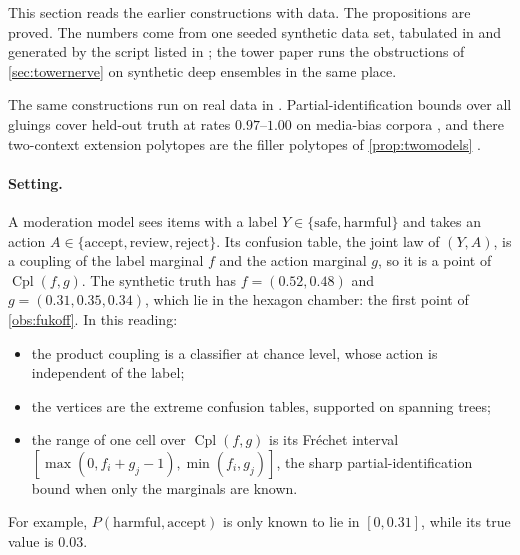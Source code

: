 \documentclass[11pt]{article}
\theoremstyle{definition}
\theoremstyle{remark}
\newcommand{\Cpl}{\operatorname{Cpl}}
\begin{document}
This section reads the earlier constructions with data. The propositions are proved. The numbers come from one
seeded synthetic data set, tabulated in \cite[\S15]{Awasthi-Family} and generated by the script listed in
\cite[Section~15]{Awasthi-Tower}; the tower paper runs the obstructions of \cref{sec:towernerve} on synthetic deep
ensembles in the same place.

The same constructions run on real data in \cite{Awasthi-ThreeLayers}. Partial-identification bounds over all gluings
cover held-out truth at rates $0.97$--$1.00$ on media-bias corpora \cite[\S38.5]{Awasthi-ThreeLayers}, and there two-context
extension polytopes are the filler polytopes of \cref{prop:twomodels} \cite[\S3.10]{Awasthi-ThreeLayers}.

\paragraph{Setting.} A moderation model sees items with a label $Y\in\{\text{safe},\text{harmful}\}$ and takes an action
$A\in\{\text{accept},\text{review},\text{reject}\}$. Its confusion table, the joint law of $(Y,A)$, is a coupling of the label
marginal $f$ and the action marginal $g$, so it is a point of $\Cpl(f,g)$. The synthetic truth has $f=(0.52,0.48)$ and
$g=(0.31,0.35,0.34)$, which lie in the hexagon chamber: the first point of \cref{obs:fukoff}. In this reading:
\begin{itemize}[leftmargin=*]
\item the product coupling is a classifier at chance level, whose action is independent of the label;
\item the vertices are the extreme confusion tables, supported on spanning trees;
\item the range of one cell over $\Cpl(f,g)$ is its Fr\'echet interval $[\max(0,f_i+g_j-1),\min(f_i,g_j)]$, the sharp
  partial-identification bound when only the marginals are known.
\end{itemize}
For example, $P(\text{harmful},\text{accept})$ is only known to lie in $[0,0.31]$, while its true value is $0.03$.
\end{document}
